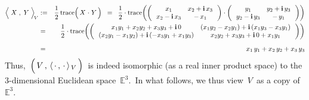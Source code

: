 \begin{eqnarray*}
\left\langle\;
	\overset{{\color{white}.}}{X}
	\; , \;
	Y
	\;\right\rangle_{\!V}
& := &
	\dfrac{1}{2}\,
	\trace\!\left(\,X \overset{{\color{white}1}}{\cdot} Y\,\right)
\;\; = \;\;
	\dfrac{1}{2}\cdot\trace\!\left(
		\left(\,\begin{array}{cc}
			x_{1} & x_{2} + \i\,x_{3}
			\\
			x_{2} - \i\,x_{3} & -\,x_{1}
			\end{array}\,\right)
		\cdot
		\left(\,\begin{array}{cc}
			y_{1} & y_{2} + \i\,y_{3}
			\\
			y_{2} - \i\,y_{3} & -\,y_{1}
			\end{array}\,\right)
		\right)
\\
& = &
	\dfrac{1}{2}\cdot\trace\!\left(
		\left(\,\begin{array}{cc}
			x_{1}y_{1} + x_{2}y_{2} + x_{3}y_{3} + \i\,0 & (x_{1}y_{2} - x_{2}y_{1}) + \i\,(x_{1}y_{3}-x_{3}y_{1})
			\\
			(x_{2}y_{1}-x_{1}y_{2}) + \i\,(-x_{3}y_{1}+x_{1}y_{3}) & x_{2}y_{2} + x_{3}y_{3} + \i\,0 + x_{1}y_{1}
			\end{array}\,\right)
		\right)
\\
& = &
	\overset{{\color{white}1}}{x_{1}\,y_{1} + x_{2}\,y_{2} + x_{3}\,y_{3}}
\end{eqnarray*}
Thus,
\,$\left(\,\overset{{\color{white}.}}{V}\,,\,\langle\,\cdot\,,\,\cdot\,\rangle_{\,V}\,\right)$\,
is indeed isomorphic (as a real inner product space) to the $3$-dimensional Euclidean space \,$\mathbb{E}^{3}$.\,
In what follows, we thus view \,$V$\, as a copy of \,$\mathbb{E}^{3}$.\,

